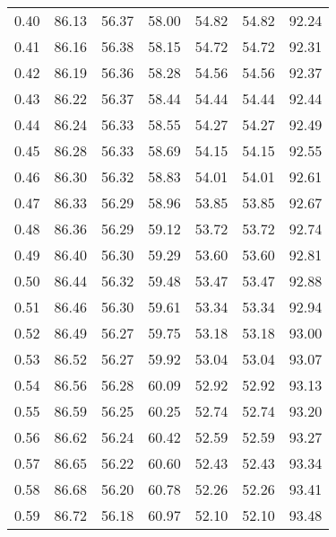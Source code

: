 \begin{tabular}{|c|c|c|c|c|c|c|}
      0.40 &     86.13 &     56.37 &      58.00 &   54.82 &      54.82 &         92.24 \\
      0.41 &     86.16 &     56.38 &      58.15 &   54.72 &      54.72 &         92.31 \\
      0.42 &     86.19 &     56.36 &      58.28 &   54.56 &      54.56 &         92.37 \\
      0.43 &     86.22 &     56.37 &      58.44 &   54.44 &      54.44 &         92.44 \\
      0.44 &     86.24 &     56.33 &      58.55 &   54.27 &      54.27 &         92.49 \\
      0.45 &     86.28 &     56.33 &      58.69 &   54.15 &      54.15 &         92.55 \\
      0.46 &     86.30 &     56.32 &      58.83 &   54.01 &      54.01 &         92.61 \\
      0.47 &     86.33 &     56.29 &      58.96 &   53.85 &      53.85 &         92.67 \\
      0.48 &     86.36 &     56.29 &      59.12 &   53.72 &      53.72 &         92.74 \\
      0.49 &     86.40 &     56.30 &      59.29 &   53.60 &      53.60 &         92.81 \\
      0.50 &     86.44 &     56.32 &      59.48 &   53.47 &      53.47 &         92.88 \\
      0.51 &     86.46 &     56.30 &      59.61 &   53.34 &      53.34 &         92.94 \\
      0.52 &     86.49 &     56.27 &      59.75 &   53.18 &      53.18 &         93.00 \\
      0.53 &     86.52 &     56.27 &      59.92 &   53.04 &      53.04 &         93.07 \\
      0.54 &     86.56 &     56.28 &      60.09 &   52.92 &      52.92 &         93.13 \\
      0.55 &     86.59 &     56.25 &      60.25 &   52.74 &      52.74 &         93.20 \\
      0.56 &     86.62 &     56.24 &      60.42 &   52.59 &      52.59 &         93.27 \\
      0.57 &     86.65 &     56.22 &      60.60 &   52.43 &      52.43 &         93.34 \\
      0.58 &     86.68 &     56.20 &      60.78 &   52.26 &      52.26 &         93.41 \\
      0.59 &     86.72 &     56.18 &      60.97 &   52.10 &      52.10 &         93.48 \\

\end{tabular}
